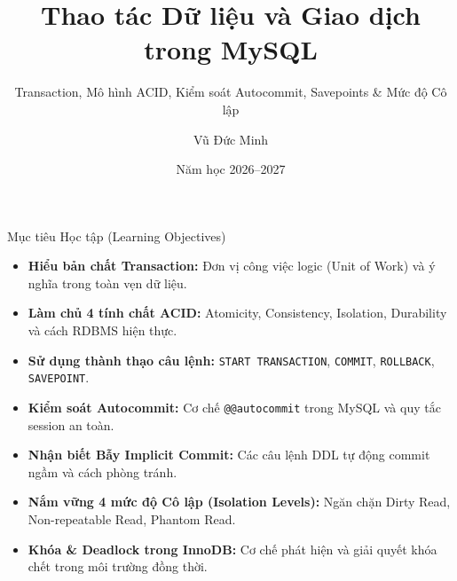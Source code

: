 \documentclass[aspectratio=169,11pt]{beamer}
\title[Thao tác Dữ liệu \& Giao dịch MySQL]{Thao tác Dữ liệu và Giao dịch trong MySQL}
\subtitle{Transaction, Mô hình ACID, Kiểm soát Autocommit, Savepoints \& Mức độ Cô lập}
\author[Vũ Đức Minh]{Vũ Đức Minh}
\institute[NEU]{Khoa Công nghệ Thông tin --- Trường Đại học Kinh tế Quốc dân (NEU)}
\date{Năm học 2026--2027}
\newcommand{\code}[1]{\texttt{#1}}
\begin{document}
\begin{frame}
  \titlepage
\end{frame}

\begin{frame}{Mục tiêu Học tập (Learning Objectives)}
  \begin{itemize}
    \item \textbf{Hiểu bản chất Transaction:} Đơn vị công việc logic (Unit of Work) và ý nghĩa trong toàn vẹn dữ liệu.
    \item \textbf{Làm chủ 4 tính chất ACID:} Atomicity, Consistency, Isolation, Durability và cách RDBMS hiện thực.
    \item \textbf{Sử dụng thành thạo câu lệnh:} \code{START TRANSACTION}, \code{COMMIT}, \code{ROLLBACK}, \code{SAVEPOINT}.
    \item \textbf{Kiểm soát Autocommit:} Cơ chế \code{@@autocommit} trong MySQL và quy tắc session an toàn.
    \item \textbf{Nhận biết Bẫy Implicit Commit:} Các câu lệnh DDL tự động commit ngầm và cách phòng tránh.
    \item \textbf{Nắm vững 4 mức độ Cô lập (Isolation Levels):} Ngăn chặn Dirty Read, Non-repeatable Read, Phantom Read.
    \item \textbf{Khóa \& Deadlock trong InnoDB:} Cơ chế phát hiện và giải quyết khóa chết trong môi trường đồng thời.
  \end{itemize}
\end{frame}
\end{document}
